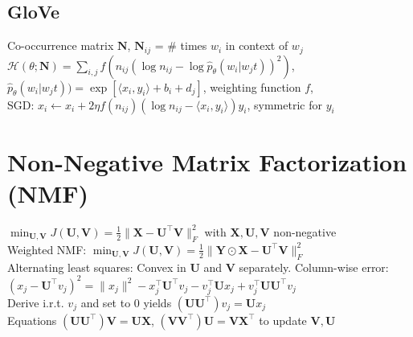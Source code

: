 \documentclass[a4paper, 11pt, landscape]{article}
\begin{document}
\begin{multicols*}{3}
\subsection{GloVe}
Co-occurrence matrix $\mathbf{N}$, $\mathbf{N}_{ij}$ = \# times $w_i$ in context of $w_j$ \\
$\mathcal{H}(\theta;\mathbf{N}) = \sum_{i,j}f(n_{ij}(\log n_{ij} - \log \hat{p}_\theta (w_i|w_jt))^2)$,\\
$\hat{p}_\theta (w_i|w_jt)) = \exp [\langle x_i,y_i \rangle +b_i + d_j ] $, weighting function $f$,\\
SGD: $x_i \gets x_i + 2\eta f(n_{ij})(\log n_{ij} - \langle x_i,y_i \rangle ) y_i$, symmetric for $y_i$


\section{Non-Negative Matrix Factorization (NMF)}
$\min_{\mathbf{U,V}} J(\mathbf{U,V}) = \frac{1}{2}\|\mathbf{X}-\mathbf{U}^\top \mathbf{V}\|^2_F$ with $\mathbf{X,U,V}$ non-negative\\
Weighted NMF: $\min_{\mathbf{U,V}} J(\mathbf{U,V}) = \frac{1}{2}\|\mathbf{Y} \odot \mathbf{X}-\mathbf{U}^\top \mathbf{V}\|^2_F$\\
Alternating least squares: Convex in $\mathbf{U}$ and $\mathbf{V}$ separately.
Column-wise error:\\
$(x_j-\mathbf{U}^\top v_j)^2=\|x_j\|^2-x^\top_j\mathbf{U}^\top v_j-v^\top_j\mathbf{U}x_j+v^\top_j\mathbf{UU}^\top v_j$\\
Derive i.r.t. $v_j$ and set to 0 yields $(\mathbf{UU}^\top)v_j=\mathbf{U}x_j$\\
Equations $(\mathbf{UU}^\top)\mathbf{V} = \mathbf{UX}$, $(\mathbf{VV}^\top)\mathbf{U} = \mathbf{VX}^\top$ to update $\mathbf{V,U}$



\end{multicols*}
\end{document}
